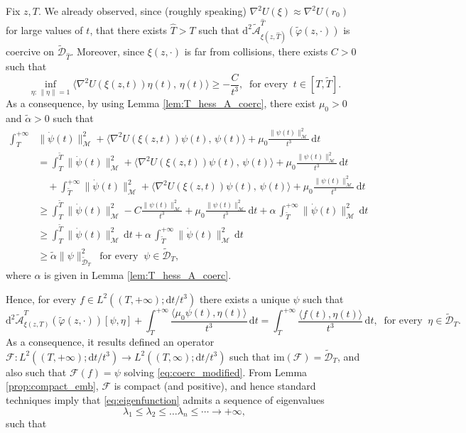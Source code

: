 \documentclass[a4paper,10pt]{amsart}
\newcommand{\ud}{\mathrm{d}}
\theoremstyle{plain}
\theoremstyle{definition}
\numberwithin{equation}{section}
\numberwithin{thm}{section}
\begin{document}
Fix $z,T$. We already observed, since (roughly speaking) $\nabla^2 U(\xi)\approx \nabla^2 U(r_0)$ for large values of $t$,  that there exists $\hat T >T$ such that $\ud^2 \tilde{\mathcal{A}}_{\xi(z,\hat T)}^{\hat T}(\tilde \varphi(z,\cdot))$ is coercive on $\tilde{\mathcal{D}}_{\hat T}$. Moreover, since $\xi(z,\cdot)$ is far from collisions, there exists $C>0$ such that
\[
\inf_{\eta:\, \|\eta\|=1} \langle \nabla^2 U(\xi(z,t))\eta(t),\,\eta(t)\rangle \ge - \frac{C}{t^3}, \ \mbox{ for every } \ t \in [T, \tilde T].
\]
As a consequence, by  using Lemma \ref{lem:T_hess_A_coerc}, there exist $\mu_0 >0$ and $\tilde\alpha>0$ such that
\[
\begin{split}
\int_T^{+\infty} &\|\dot \psi(t)\|_\mathcal{M}^2+\langle \nabla^2 U(\xi(z,t))\psi(t),\,\psi(t)\rangle + \mu_0 \frac{\|\psi(t)\|_\mathcal{M}^2}{t^3}\, \ud t \\
&= \int_{T}^{\tilde T} \|\dot \psi(t)\|_\mathcal{M}^2+\langle \nabla^2 U(\xi(z,t))\psi(t),\,\psi(t)\rangle + \mu_0 \frac{\|\psi(t)\|_\mathcal{M}^2}{t^3}\, \ud t \\
& \quad + \int_{\tilde T}^{+\infty} \|\dot \psi(t)\|_\mathcal{M}^2+\langle \nabla^2 U(\xi(z,t))\psi(t),\,\psi(t)\rangle + \mu_0 \frac{\|\psi(t)\|_\mathcal{M}^2}{t^3}\, \ud t
\\
&\ge \int_{T}^{\tilde T}  \|\dot \psi(t)\|_\mathcal{M}^2-C\frac{\|\psi(t)\|_\mathcal{M}^2}{t^3} +\mu_0 \frac{\|\psi(t)\|_\mathcal{M}^2}{t^3}\, \ud t  +\alpha\,\int_{\tilde T}^{+\infty}\|\dot \psi(t)\|^2_\mathcal{M}\, \ud t
\\
&\ge \int_{T}^{\tilde T}\|\dot \psi(t)\|^2_\mathcal{M}\, \ud t+\alpha\,\int_{\tilde T}^{+\infty}\|\dot \psi(t)\|^2_\mathcal{M}\, \ud t
\\
&\ge \tilde\alpha \|\psi\|^2_{\tilde{\mathcal D}_T} \ \mbox{ for every } \ \psi \in \tilde{\mathcal D}_T,
\end{split}
\]
where $\alpha$ is given in Lemma \ref{lem:T_hess_A_coerc}.

Hence, for every $f \in L^2((T,+\infty);\ud t/t^3)$ there exists a unique $\psi$ such that
\begin{equation}
\label{eq:coerc_modified}
\ud^2 \tilde{\mathcal{A}}_{\xi(z,T)}^T(\tilde \varphi(z,\cdot))[\psi, \eta] + \int_T^{+\infty} \frac{\langle \mu_0\psi(t), \eta(t)\rangle}{t^3}\,\ud t = \int_T^{+\infty} \frac{\langle f(t), \eta(t)\rangle}{t^3}\,\ud t, \ \mbox{ for every } \ \eta \in \tilde{\mathcal D}_T.
\end{equation}
As a consequence, it results defined an operator $\mathcal{F}:L^2((T,+\infty);\ud t/t^3)\to L^2((T, \infty); \ud t/t^3)$ such that $\mathrm{im}(\mathcal{F})=\tilde{\mathcal D}_T$, and also such that $\mathcal{F}(f)=\psi$ solving \eqref{eq:coerc_modified}. From Lemma \ref{prop:compact_emb}, $\mathcal{F}$ is compact (and positive), and hence standard techniques imply that \eqref{eq:eigenfunction} admits a sequence of eigenvalues
\[
\lambda_1 \le \lambda_2 \le \dots \lambda_n\le \cdots \to +\infty,
\]
such that
\end{document}
